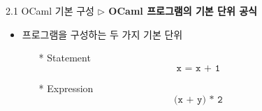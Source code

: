 \documentclass[10pt]{beamer}
\begin{document}
	\begin{frame}{2.1 OCaml 기본 구성}
		\textbf{$\triangleright$ OCaml 프로그램의 기본 단위 공식}
		
		\begin{itemize}
			\item 프로그램을 구성하는 두 가지 기본 단위
			\begin{itemize}
				\item[]
				\item[*] Statement \[
				\texttt{x = x + 1}
				\]
				\item[*] Expression \[
				\texttt{(x + y) * 2}
				\]
			\end{itemize}
			\item[]
			\item[]
			\item[]
			\begin{itemize}
				\item[]
				\item[]
				\begin{itemize}
					\item[] 
					\item[]
				\end{itemize}
				\item[]
				\item[]
				\begin{itemize}
					\item[]
					\item[]
				\end{itemize}
			\end{itemize}
		\end{itemize}
	\end{frame}
	
\end{document}
